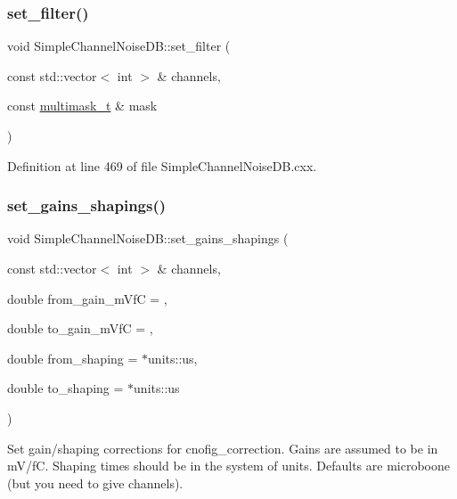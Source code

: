 \subsubsection{\texorpdfstring{set\+\_\+filter()}{set\_filter()}}
{\footnotesize\ttfamily void Simple\+Channel\+Noise\+D\+B\+::set\+\_\+filter (\begin{DoxyParamCaption}\item[{const std\+::vector$<$ int $>$ \&}]{channels,  }\item[{const \hyperlink{class_wire_cell_1_1_sig_proc_1_1_simple_channel_noise_d_b_ac88af8d617681e36c68c5f1899452d01}{multimask\+\_\+t} \&}]{mask }\end{DoxyParamCaption})}



Definition at line 469 of file Simple\+Channel\+Noise\+D\+B.\+cxx.

\mbox{\label{class_wire_cell_1_1_sig_proc_1_1_simple_channel_noise_d_b_a82e2e7cf205e61e1ab1e7970aa6655cb}} 
\subsubsection{\texorpdfstring{set\+\_\+gains\+\_\+shapings()}{set\_gains\_shapings()}}
{\footnotesize\ttfamily void Simple\+Channel\+Noise\+D\+B\+::set\+\_\+gains\+\_\+shapings (\begin{DoxyParamCaption}\item[{const std\+::vector$<$ int $>$ \&}]{channels,  }\item[{double}]{from\+\_\+gain\+\_\+m\+VfC = {},  }\item[{double}]{to\+\_\+gain\+\_\+m\+VfC = {},  }\item[{double}]{from\+\_\+shaping = {$\ast$units\+:\+:us},  }\item[{double}]{to\+\_\+shaping = {$\ast$units\+:\+:us} }\end{DoxyParamCaption})}

Set gain/shaping corrections for cnofig\+\_\+correction. Gains are assumed to be in m\+V/fC. Shaping times should be in the system of units. Defaults are microboone (but you need to give channels). 

